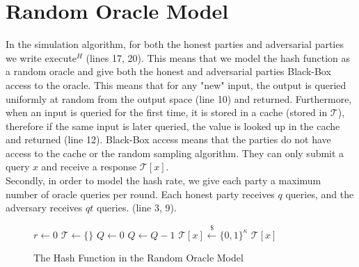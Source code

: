 \section{Random Oracle Model}
In the simulation algorithm, for both the honest parties and adversarial parties we write {\textsf{execute}}$^H$ (lines 17, 20). This means that we model the hash function as a random oracle and give both the honest and adversarial parties Black-Box access to the oracle. This means that for any "new" input, the output is queried uniformly at random from the output space (line 10) and returned. Furthermore, when an input is queried for the first time, it is stored in a cache (stored in $\mathcal{T}$), therefore if the same input is later queried, the value is looked up in the cache and returned (line 12). Black-Box access means that the parties do not have access to the cache or the random sampling algorithm. They can only submit a query $x$ and receive a response $\mathcal{T}[x]$.
\\
Secondly, in order to model the hash rate, we give each party a maximum number of oracle queries per round. Each honest party receives $q$ queries, and the adversary receives $qt$ queries. (line 3, 9).
\begin{figure}[H]
\begin{algorithm}[H]
    \caption{\label{alg.hash} The Hash Function in the Random Oracle Model}
    \begin{algorithmic}[1]
        \State $r \leftarrow 0$
        \State $\mathcal{T} \leftarrow \{\}$ 
        \State $Q \leftarrow 0$ 
             
                 
                    \State\Return{$\bot$}
                \EndIf
                \State $Q \leftarrow Q - 1$
                \State$\mathcal{T}[x] \overset{\$}{\leftarrow} \{0, 1\}^\kappa$ 
            \EndIf
            \State\Return$\mathcal{T}[x]$ 
        \EndFunction
        \vskip8pt
    \end{algorithmic}
\end{algorithm}
\end{figure}



